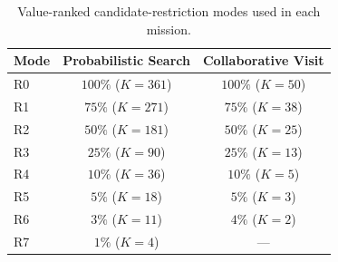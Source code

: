 \begin{table}[t]
\centering
\caption{Value-ranked candidate-restriction modes used in each mission.}
\label{tab:restriction_modes}
\begin{tabular}{lcc}
\hline
Mode & Probabilistic Search & Collaborative Visit \\
\hline
R0 & $100\%$ ($K=361$) & $100\%$ ($K=50$) \\
R1 & $75\%$ ($K=271$)  & $75\%$ ($K=38$) \\
R2 & $50\%$ ($K=181$)  & $50\%$ ($K=25$) \\
R3 & $25\%$ ($K=90$)   & $25\%$ ($K=13$) \\
R4 & $10\%$ ($K=36$)   & $10\%$ ($K=5$) \\
R5 & $5\%$ ($K=18$)    & $5\%$ ($K=3$) \\
R6 & $3\%$ ($K=11$)    & $4\%$ ($K=2$) \\
R7 & $1\%$ ($K=4$)     & --- \\
\hline
\end{tabular}
\end{table}
